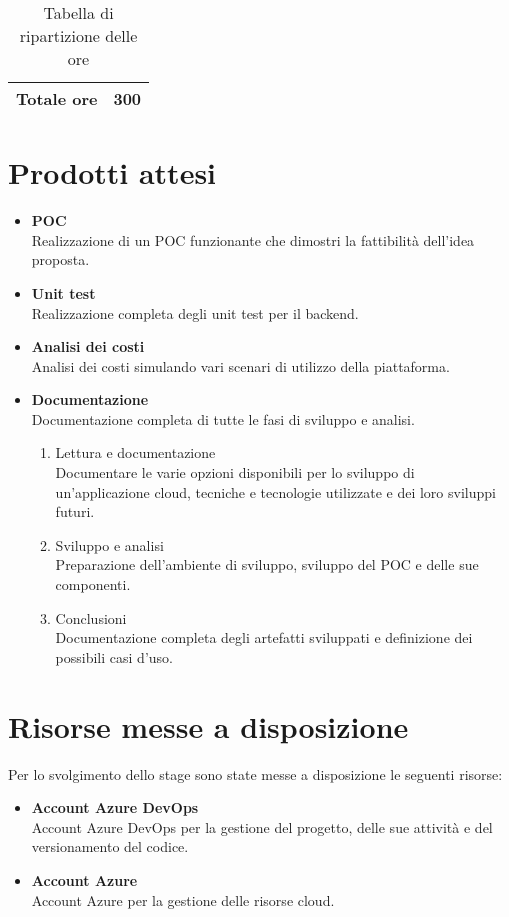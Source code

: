 \begin{table}[!h]
\begin{tabularx}{\textwidth}{|c|X|}
        \textbf{Totale ore} & \multicolumn{1}{|c|}{\textbf{300}} \\\hline
        
        
    \end{tabularx}
    \caption{Tabella di ripartizione delle ore}

\end{table}
\section{Prodotti attesi}
\label{sec:prodotti-attesi}
\begin{itemize}
    \item \textbf{POC} \\
    Realizzazione di un POC funzionante che dimostri la fattibilità dell'idea proposta.
    \item \textbf{Unit test} \\
    Realizzazione completa degli unit test per il backend.\\
    \item \textbf{Analisi dei costi} \\
    Analisi dei costi simulando vari scenari di utilizzo della piattaforma.\\
    \item \textbf{Documentazione} \\
    Documentazione completa di tutte le fasi di sviluppo e analisi.
    \begin{enumerate}
        \item Lettura e documentazione \\
         Documentare le varie opzioni disponibili per lo sviluppo di un'applicazione cloud, tecniche e tecnologie utilizzate e dei loro sviluppi futuri.
        
        \item Sviluppo e analisi \\
        Preparazione dell'ambiente di sviluppo, sviluppo del POC e delle sue componenti.
    
        
        \item Conclusioni \\
        Documentazione completa degli artefatti sviluppati e definizione dei possibili casi d'uso.
    \end{enumerate}
\end{itemize}
\section{Risorse messe a disposizione}
\label{sec:risorse-messe-a-disposizione}
Per lo svolgimento dello stage sono state messe a disposizione le seguenti risorse:
\begin{itemize}
    \item \textbf{Account Azure DevOps} \\
    Account Azure DevOps per la gestione del progetto, delle sue attività e del versionamento del codice.
    \item \textbf{Account Azure} \\
    Account Azure per la gestione delle risorse cloud.
\end{itemize}

